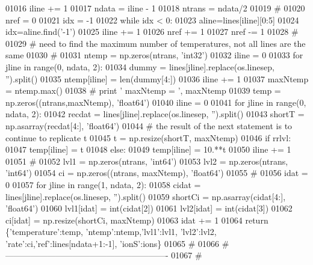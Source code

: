 \begin{DoxyCode}
01016         iline += 1
01017     ndata = iline - 1
01018     ntrans = ndata/2
01019     \textcolor{comment}{#}
01020     nref = 0
01021     idx = -1
01022     \textcolor{keywordflow}{while} idx < 0:
01023         aline=lines[iline][0:5]
01024         idx=aline.find(\textcolor{stringliteral}{'-1'})
01025         iline += 1
01026         nref += 1
01027     nref -= 1
01028     \textcolor{comment}{#}
01029     \textcolor{comment}{# need to find the maximum number of temperatures, not all lines are the same}
01030     \textcolor{comment}{#}
01031     ntemp = np.zeros(ntrans, \textcolor{stringliteral}{'int32'})
01032     iline = 0
01033     \textcolor{keywordflow}{for} jline \textcolor{keywordflow}{in} range(0, ndata, 2):
01034         dummy = lines[jline].replace(os.linesep, \textcolor{stringliteral}{''}).split()
01035         ntemp[iline] = len(dummy[4:])
01036         iline += 1
01037     maxNtemp = ntemp.max()
01038 \textcolor{comment}{#   print ' maxNtemp = ', maxNtemp}
01039     temp = np.zeros((ntrans,maxNtemp), \textcolor{stringliteral}{'float64'})
01040     iline = 0
01041     \textcolor{keywordflow}{for} jline \textcolor{keywordflow}{in} range(0, ndata, 2):
01042         recdat = lines[jline].replace(os.linesep, \textcolor{stringliteral}{''}).split()
01043         shortT = np.asarray(recdat[4:], \textcolor{stringliteral}{'float64'})
01044         \textcolor{comment}{# the result of the next statement is to continue to replicate t}
01045         t = np.resize(shortT, maxNtemp)
01046         \textcolor{keywordflow}{if} rrlvl:
01047             temp[iline] = t
01048         \textcolor{keywordflow}{else}:
01049             temp[iline] = 10.**t
01050         iline += 1
01051     \textcolor{comment}{#}
01052     lvl1 = np.zeros(ntrans, \textcolor{stringliteral}{'int64'})
01053     lvl2 = np.zeros(ntrans, \textcolor{stringliteral}{'int64'})
01054     ci = np.zeros((ntrans, maxNtemp), \textcolor{stringliteral}{'float64'})
01055     \textcolor{comment}{#}
01056     idat = 0
01057     \textcolor{keywordflow}{for} jline \textcolor{keywordflow}{in} range(1, ndata, 2):
01058         cidat = lines[jline].replace(os.linesep, \textcolor{stringliteral}{''}).split()
01059         shortCi = np.asarray(cidat[4:], \textcolor{stringliteral}{'float64'})
01060         lvl1[idat] = int(cidat[2])
01061         lvl2[idat] = int(cidat[3])
01062         ci[idat] = np.resize(shortCi, maxNtemp)
01063         idat += 1
01064     \textcolor{keywordflow}{return} \{\textcolor{stringliteral}{'temperature'}:temp, \textcolor{stringliteral}{'ntemp'}:ntemp,\textcolor{stringliteral}{'lvl1'}:lvl1, \textcolor{stringliteral}{'lvl2'}:lvl2, \textcolor{stringliteral}{'rate'}:ci,\textcolor{stringliteral}{'ref'}:lines[ndata+1:-1], \textcolor{stringliteral}{
      'ionS'}:ions\}
01065     \textcolor{comment}{#}
01066     \textcolor{comment}{# ----------------------------------------------------------}
01067     \textcolor{comment}{#}
\end{DoxyCode}
\hypertarget{namespacepyneb_1_1utils_1_1__chianti__tools_a92cf299ad3407ee8923739e2761ab13f}{}
